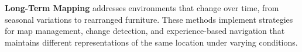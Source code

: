 \documentclass[12pt]{article}
\begin{document}
    \textbf{Long-Term Mapping} addresses environments that change over time, from seasonal variations to rearranged furniture. These methods implement strategies for map management, change detection, and experience-based navigation that maintains 
    different representations of the same location under varying conditions.
    

    
    \newpage
    \printbibliography[title={References}]
\end{document}
